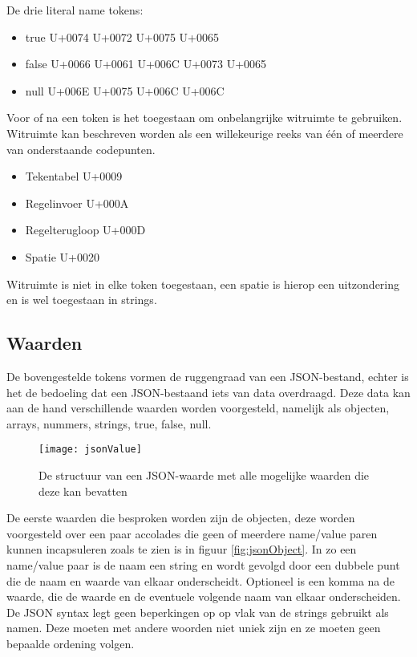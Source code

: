 De drie literal name tokens:

\begin{itemize}
    \item true      U+0074 U+0072 U+0075 U+0065
    \item false     U+0066 U+0061 U+006C U+0073 U+0065
    \item null      U+006E U+0075 U+006C U+006C 
\end{itemize}

Voor of na een token is het toegestaan om onbelangrijke witruimte te gebruiken. Witruimte kan beschreven worden als een willekeurige reeks van één of meerdere van onderstaande codepunten.

\begin{itemize}
    \item Tekentabel        U+0009
    \item Regelinvoer       U+000A
    \item Regelterugloop    U+000D
    \item Spatie            U+0020
\end{itemize}

Witruimte is niet in elke token toegestaan, een spatie is hierop een uitzondering en is wel toegestaan in strings.

\subsection{Waarden}
\label{subsec:Waarden}

De bovengestelde tokens vormen de ruggengraad van een JSON-bestand, echter is het de bedoeling dat een JSON-bestaand iets van data overdraagd. Deze data kan aan de hand verschillende waarden worden voorgesteld, namelijk als objecten, arrays, nummers, strings, true, false, null.

\begin{figure}[h]
    \centering
    \texttt{[image: jsonValue]}
   \caption[JSON values]{De structuur van een JSON-waarde met alle mogelijke waarden die deze kan bevatten}
   \label{fig:jsonValue}
\end{figure}

De eerste waarden die besproken worden zijn de objecten, deze worden voorgesteld over een paar accolades die geen of meerdere name/value paren kunnen incapsuleren zoals te zien is in figuur \ref{fig:jsonObject}. In zo een name/value paar is de naam een string en wordt gevolgd door een dubbele punt die de naam en waarde van elkaar onderscheidt. Optioneel is een komma na de waarde, die de waarde en de eventuele volgende naam van elkaar onderscheiden. De JSON syntax legt geen beperkingen op op vlak van de strings gebruikt als namen. Deze moeten met andere woorden niet uniek zijn en ze moeten geen bepaalde ordening volgen.

